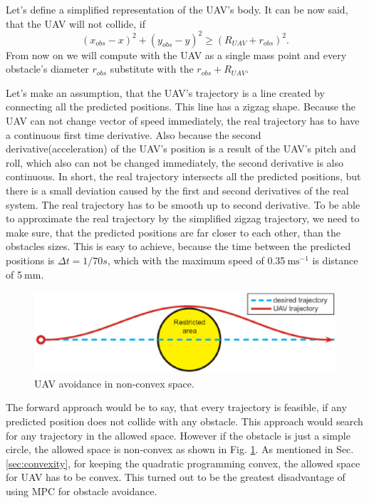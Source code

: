 \documentclass[a4paper,11pt,titlepage]{article}
\newcommand{\jed}[1]{\ensuremath{~\mathrm{#1}}}
\begin{document}
Let's define a simplified representation of the UAV's body. It can be now said, that the UAV will not collide, if 
\begin{equation}
(x_{obs} - x)^2 + (y_{obs} - y)^2 \geq (R_{UAV} + r_{obs})^2.
\end{equation}
From now on we will compute with the UAV as a single mass point and every obstacle's diameter $r_{obs}$ substitute with the $r_{obs} + R_{UAV}$.	 

Let's make an assumption, that the UAV's trajectory is a line created by connecting all the predicted positions. This line has a zigzag shape. Because the UAV can not change vector of speed immediately, the real trajectory has to have a continuous first time derivative. Also because the second derivative(acceleration) of the UAV's position is a result of the UAV's pitch and roll, which also can not be changed immediately, the second derivative is also continuous. In short, the real trajectory intersects all the predicted positions, but there is a small deviation caused by the first and second derivatives of the real system. The real trajectory has to be smooth up to second derivative. To be able to approximate the real trajectory by the simplified zigzag trajectory, we need to make sure, that the predicted positions are far closer to each other, than the obstacles sizes. This is easy to achieve, because the time between the predicted positions is $\Delta t = 1/70s$, which with the maximum speed of 0.35\jed{ms^{-1}} is distance of 5\jed{mm}.

\begin{figure}[h]
\centering
\includegraphics[width=1\textwidth]{fig/perfect_collision_avoidance_arrow.eps} 
\caption{UAV avoidance in non-convex space.}
\label{fig:perfect_collision_avoidance}
\end{figure}

The forward approach would be to say, that every trajectory is feasible, if any predicted position does not collide with any obstacle. This approach would search for any trajectory in the allowed space. However if the obstacle is just a simple circle, the allowed space is non-convex as shown in Fig. \ref{fig:perfect_collision_avoidance}. As mentioned in Sec.  \ref{sec:convexity}, for keeping the quadratic programming convex, the allowed space for UAV has to be convex. This turned out to be the greatest disadvantage of using MPC for obstacle avoidance. 
\end{document}
